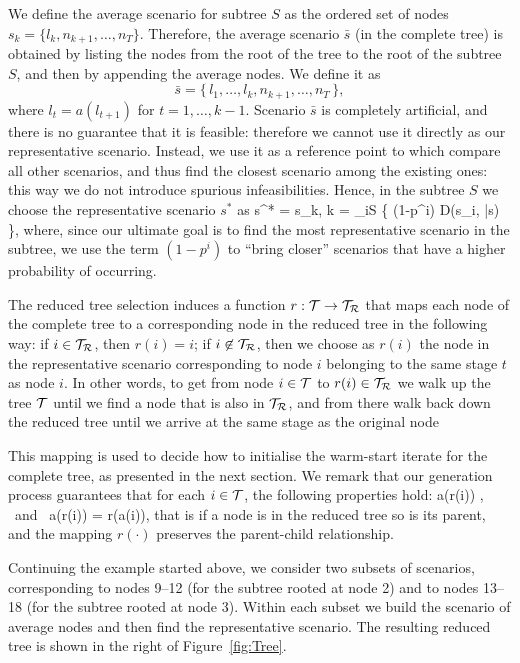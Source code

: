 We define the average scenario for subtree $S$ as the ordered
set of nodes $s_k = \{ l_k, n_{k+1}, \ldots, n_T \}$.
Therefore, the average scenario $\bar s$ (in the complete tree) 
is obtained by listing the 
nodes from the root of the tree to the root of the subtree $S$, and 
then by appending the average nodes. We define it as
\[
\bar s = \{\, l_1, \ldots, l_k, n_{k+1}, \ldots, n_T \,\},
\]
where $l_t = a(l_{t+1})$ for $t = 1,\ldots, k-1$.
Scenario $\bar{s}$ is completely artificial, and there is no guarantee 
that it is feasible: therefore we cannot use it directly as our 
representative scenario. Instead, we use it as a reference point to 
which compare all other scenarios, and thus find the closest scenario 
among the existing ones: this way we do not introduce spurious 
infeasibilities. Hence, in the subtree $S$ we choose the 
representative scenario $s^*$ as 
%
\be  \label{repScenario}
   s^* = s_k, \quad k = \arg\min_{i\in S} \{ (1-p^i) D(s_i, \bar{s}) \},
\ee
%
where, since our ultimate goal is to find the most representative scenario in 
the subtree, we use the term $(1-p^i)$ to ``bring closer'' scenarios 
that have a higher probability of occurring.

The reduced tree selection induces a function $r: \mathcal{T} \to \mathcal{T}_\mathcal{R}$ 
that maps each node of the complete tree to a corresponding node 
in the reduced tree in the following way: if $i \in \mathcal{T}_\mathcal{R}$, then
$r(i) = i$; if $i\not\in \mathcal{T}_\mathcal{R}$, then we choose as $r(i)$ the node in 
the representative scenario corresponding to node $i$ belonging to the
same stage $t$ as node $i$. In other words, to get from node
$i\in\mathcal{T}$ to $r(i)\in\mathcal{T}_\mathcal{R}$ we walk up the tree $\mathcal{T}$ until we
find a node that is also in $\mathcal{T}_\mathcal{R}$, and from there walk back down
the reduced tree until we arrive at the same stage as the original node

This mapping is used to decide how to initialise 
the warm-start iterate for the complete tree, as presented in the
next section. We remark that our generation process guarantees
that for each $i \in \mathcal{T}$, the following properties hold:
\be  \label{eq:ReducedTreeProperties}
  a(r(i)) \in \Rtree, \quad \mbox{ and } \quad a(r(i)) = r(a(i)),
\ee
that is if a node is in the reduced tree so is its parent, and the
mapping $r(\cdot)$ preserves the parent-child relationship. 

Continuing the example started above, we consider two subsets of 
scenarios, corresponding to nodes 9--12 (for the subtree rooted at 
node 2) and to nodes 13--18 (for the subtree rooted at node 3). Within 
each subset we build the scenario of average nodes and then find the 
representative scenario.
The resulting reduced tree is shown in the right of Figure~\ref{fig:Tree}.

